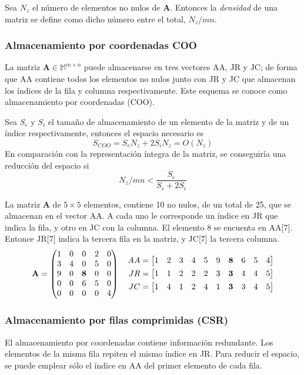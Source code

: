 Sea $N_z$ el número de elementos no nulos de \textbf{A}. Entonces la 
\textit{densidad} de una matriz se define como dicho número entre el total, 
$N_z/mn$.

\subsubsection{Almacenamiento por coordenadas COO}

La matriz $\textbf{A} \in \mathbb{M}^{m\times n}$ puede almacenarse en tres 
vectores AA, JR y JC; de forma que AA contiene todos los elementos no nulos 
junto con JR y JC que almacenan los índices de la fila y columna 
respectivamente. Este esquema se conoce como almacenamiento por coordenadas 
(COO).

Sea $S_e$ y $S_i$ el tamaño de almacenamiento de un elemento de la matriz y de 
un índice respectivamente, entonces el espacio necesario es
$$ S_{COO} = S_eN_z + 2S_iN_z = O(N_z)$$
En comparación con la representación íntegra de la matriz, se conseguiría una 
reducción del espacio si
$$ N_z/mn < \frac{S_e}{S_e + 2S_i} $$

\begin{ejemplo}
La matriz \textbf{A} de $5\times5$ elementos, contiene 10 no nulos, de un total 
de 25, que se almacenan en el vector AA. A cada uno le corresponde un índice en 
JR que indica la fila, y otro en JC con la columna. El elemento 8 se encuenta en 
AA[7]. Entonce JR[7] indica la tercera fila en la matriz, y JC[7] la tercera 
columna.
$$ \textbf{A} = \begin{pmatrix} 
	1 & 0 & 0 & 2 & 0 \\
	3 & 4 & 0 & 5 & 0 \\
	9 & 0 & \textbf{8} & 0 & 0 \\
	0 & 0 & 6 & 5 & 0 \\
	0 & 0 & 0 & 0 & 4  \end{pmatrix}
\quad
\begin{aligned}
	AA = \begin{bmatrix}  1 & 2 & 3 & 4 & 5 & 9 & \textbf{8} & 6 & 5 & 4 \end{bmatrix} \\
	JR = \begin{bmatrix}  1 & 1 & 2 & 2 & 2 & 3 & \textbf{3} & 4 & 4 & 5 \end{bmatrix} \\
	JC = \begin{bmatrix}  1 & 4 & 1 & 2 & 4 & 1 & \textbf{3} & 3 & 4 & 5 \end{bmatrix}
\end{aligned}
$$
\end{ejemplo}

\subsubsection{Almacenamiento por filas comprimidas (CSR)}

El almacenamiento por coordenadas contiene información redundante. Los elementos 
de la misma fila repiten el mismo índice en JR. Para reducir el espacio, se 
puede emplear sólo el índice en AA del primer elemento de cada fila.

